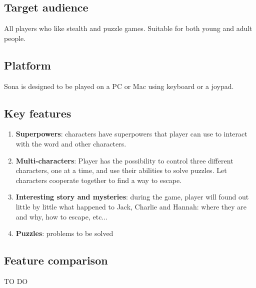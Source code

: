 \subsection{Target audience}
All players who like stealth and puzzle games. Suitable for both young and adult people.

\subsection{Platform}
Sona is designed to be played on a PC or Mac using keyboard or a joypad.

\subsection{Key features}
\begin{enumerate}
	\item \textbf{Superpowers}: characters have superpowers that player can use to interact with the word and other characters.
	\item \textbf{Multi-characters}: Player has the possibility to control three different characters, one at a time, and use their abilities to solve puzzles. Let characters cooperate together to find a way to escape.
	\item \textbf{Interesting story and mysteries}: during the game, player will found out little by little what happened to Jack, Charlie and Hannah: where they are and why, how to escape, etc...
	\item \textbf{Puzzles}: problems to be solved
\end{enumerate}

\subsection{Feature comparison}
TO DO
